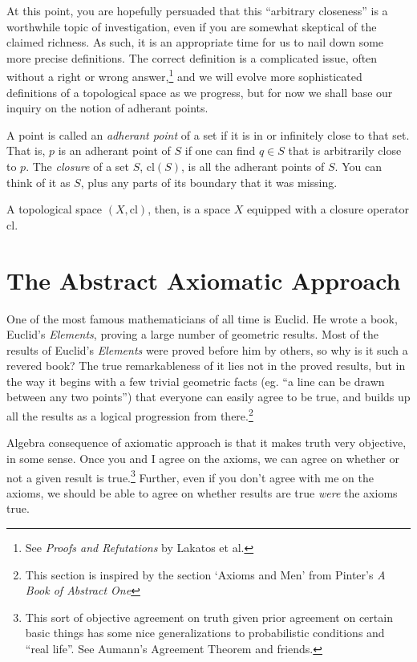 \documentclass{report}
\newcommand{\cl}{\mathrm{cl}}
\begin{document}
At this point, you are hopefully persuaded that this ``arbitrary closeness'' is a worthwhile topic of investigation, even if you are somewhat skeptical of the claimed richness. As such, it is an appropriate time for us to nail down some more precise definitions. The correct definition is a complicated issue, often without a right or wrong answer,\footnote{See \emph{Proofs and Refutations} by Lakatos et al.} and we will evolve more sophisticated definitions of a topological space as we progress, but for now we shall base our inquiry on the notion of adherant points.

A point is called an \emph{adherant point} of a set if it is in or infinitely close to that set. That is, $p$ is an adherant point of $S$ if one can find $q ∈ S$ that is arbitrarily close to $p$. The \emph{closure} of a set $S$, $\cl(S)$, is all the adherant points of $S$. You can think of it as $S$, plus any parts of its boundary that it was missing.

A topological space $(X, \cl)$, then, is a space $X$ equipped with a closure operator $\cl$.

\section{The Abstract Axiomatic Approach}

One of the most famous mathematicians of all time is Euclid. He wrote a book, Euclid's \emph{Elements}, proving a large number of geometric results. Most of the results of Euclid's \emph{Elements} were proved before him by others, so why is it such a revered book? The true remarkableness of it lies not in the proved results, but in the way it begins with a few trivial geometric facts (eg. ``a line can be drawn between any two points'') that everyone can easily agree to be true, and builds up all the results as a logical progression from there.\footnote{This section is inspired by the section `Axioms and Men' from Pinter's \emph{A Book of Abstract One}}

Algebra consequence of axiomatic approach is that it makes truth very objective, in some sense. Once you and I agree on the axioms, we can agree on whether or not a given result is true.\footnote{This sort of objective agreement on truth given prior agreement on certain basic things has some nice generalizations to probabilistic conditions and ``real life''. See Aumann's Agreement Theorem and friends.} Further, even if you don't agree with me on the axioms, we should be able to agree on whether results are true \emph{were} the axioms true.
\end{document}
